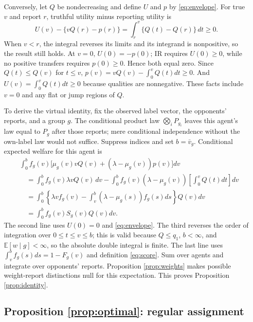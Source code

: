 \documentclass[11pt]{article}
\newcommand{\E}{\mathbb E}
\begin{document}
Conversely, let $Q$ be nondecreasing and define $U$ and $p$ by \eqref{eq:envelope}. For true $v$ and report $r$, truthful utility minus reporting utility is
\[
U(v)-\{vQ(r)-p(r)\}
=\int_r^v\{Q(t)-Q(r)\}\,dt\ge0.
\]
When $v<r$, the integral reverses its limits and its integrand is nonpositive, so the result still holds. At $v=0$, $U(0)=-p(0)$; IR requires $U(0)\ge0$, while no positive transfers requires $p(0)\ge0$. Hence both equal zero. Since $Q(t)\le Q(v)$ for $t\le v$, $p(v)=vQ(v)-\int_0^vQ(t)dt\ge0$. And $U(v)=\int_0^vQ(t)dt\ge0$ because qualities are nonnegative. These facts include $v=0$ and any flat or jump regions of $Q$.

To derive the virtual identity, fix the observed label vector, the opponents' reports, and a group $g$. The conditional product law $\bigotimes_iP_{g_i}$ leaves this agent's law equal to $P_g$ after those reports; mere conditional independence without the own-label law would not suffice. Suppress indices and set $b=\bar v_g$. Conditional expected welfare for this agent is
\begin{align*}
&\int_0^b f_g(v)\bigl[\mu_g(v)vQ(v)
+(\lambda-\mu_g(v))p(v)\bigr]dv\\
&\quad=\int_0^b f_g(v)\lambda vQ(v)\,dv
-\int_0^b f_g(v)(\lambda-\mu_g(v))
\left[\int_0^vQ(t)dt\right]dv\\
&\quad=\int_0^b\left\{\lambda vf_g(v)
-\int_v^b(\lambda-\mu_g(s))f_g(s)ds\right\}Q(v)dv\\
&\quad=\int_0^b f_g(v)S_g(v)Q(v)dv.
\end{align*}
The second line uses $U(0)=0$ and \eqref{eq:envelope}. The third reverses the order of integration over $0\le t\le v\le b$; this is valid because $Q\le q_1$, $b<\infty$, and $\E[w\mid g]<\infty$, so the absolute double integral is finite. The last line uses $\int_v^b f_g(s)ds=1-F_g(v)$ and definition \eqref{eq:score}. Sum over agents and integrate over opponents' reports. Proposition \ref{prop:weights} makes possible weight-report distinctions null for this expectation. This proves Proposition \ref{prop:identity}.

\subsection{Proposition \ref{prop:optimal}: regular assignment}
\end{document}

